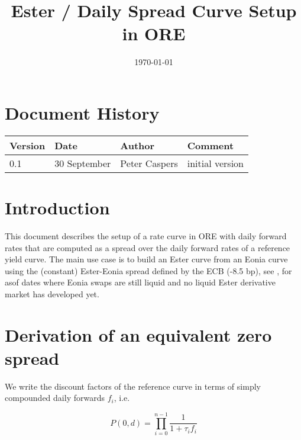 \documentclass[12pt, a4paper]{article}
\begin{document}
\title{Ester / Daily Spread Curve Setup in ORE}
\date{\today}
\maketitle

\newpage

\section*{Document History}

\begin{center} 
\begin{supertabular}{|l|l|l|p{7cm}|}
\hline
Version & Date & Author & Comment \\ 
 & 30 September & Peter Caspers & initial version\\
\hline
\end{supertabular}
\end{center}

\vspace{3cm}

\newpage


\section*{Introduction}

This document describes the setup of a rate curve in ORE with daily forward rates that are computed as a spread over the
daily forward rates of a reference yield curve. The main use case is to build an Ester curve from an Eonia curve using
the (constant) Ester-Eonia spread defined by the ECB (-8.5 bp), see \cite{ECB_EsterSpread}, for asof dates where Eonia
swaps are still liquid and no liquid Ester derivative market has developed yet.

\section*{Derivation of an equivalent zero spread}

We write the discount factors of the reference curve in terms of simply compounded daily forwards $f_i$, i.e.

\begin{equation}
P(0,d) = \prod_{i=0}^{n-1} \frac{1}{1+\tau_i f_i}
\end{equation}
\end{document}
